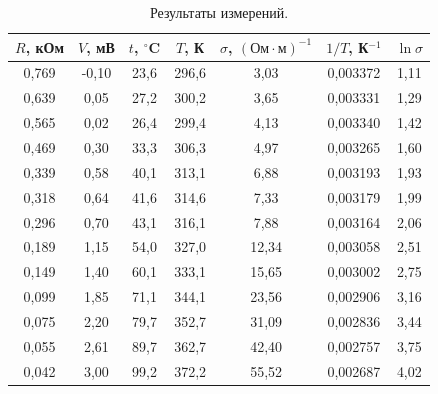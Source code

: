 \documentclass[a4paper,12pt]{article} %
\begin{document}
	\begin{table}[H]
		\caption{Результаты измерений.}
		\label{table:exp1}
		\begin{tabular}{|c|c|c|c|c|c|c|}
			\hline
			$R$, кОм & $V$, мВ & $t$, $^\circ$C & $T$, К & $\sigma$, $(\text{Ом}\cdot\text{м})^{-1}$ & $1/T$, К$^{-1}$ & $\ln \sigma$ \\ \hline
			0,769    & -0,10   & 23,6           & 296,6  & 3,03                                      & 0,003372        & 1,11         \\ \hline
			0,639    & 0,05    & 27,2           & 300,2  & 3,65                                      & 0,003331        & 1,29         \\ \hline
			0,565    & 0,02    & 26,4           & 299,4  & 4,13                                      & 0,003340        & 1,42         \\ \hline
			0,469    & 0,30    & 33,3           & 306,3  & 4,97                                      & 0,003265        & 1,60         \\ \hline
			0,339    & 0,58    & 40,1           & 313,1  & 6,88                                      & 0,003193        & 1,93         \\ \hline
			0,318    & 0,64    & 41,6           & 314,6  & 7,33                                      & 0,003179        & 1,99         \\ \hline
			0,296    & 0,70    & 43,1           & 316,1  & 7,88                                      & 0,003164        & 2,06         \\ \hline
			0,189    & 1,15    & 54,0           & 327,0  & 12,34                                     & 0,003058        & 2,51         \\ \hline
			0,149    & 1,40    & 60,1           & 333,1  & 15,65                                     & 0,003002        & 2,75         \\ \hline
			0,099    & 1,85    & 71,1           & 344,1  & 23,56                                     & 0,002906        & 3,16         \\ \hline
			0,075    & 2,20    & 79,7           & 352,7  & 31,09                                     & 0,002836        & 3,44         \\ \hline
			0,055    & 2,61    & 89,7           & 362,7  & 42,40                                     & 0,002757        & 3,75         \\ \hline
			0,042    & 3,00    & 99,2           & 372,2  & 55,52                                     & 0,002687        & 4,02         \\ \hline

\end{tabular}
\end{table}
\end{document}
